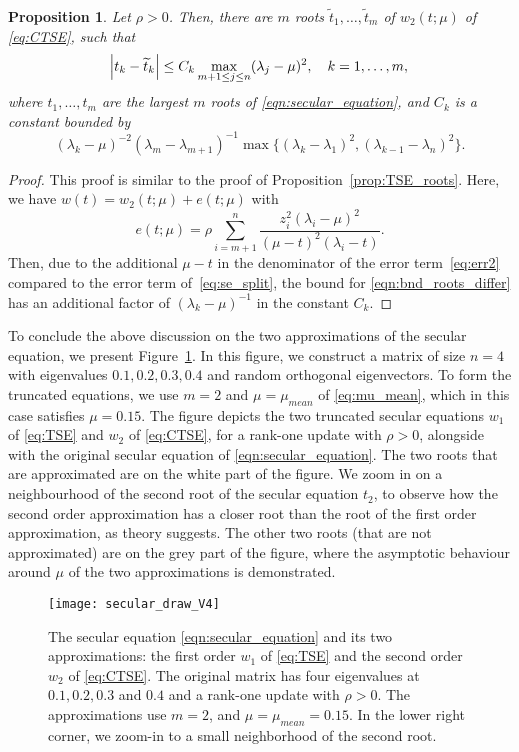 \documentclass[11pt]{article}
\newtheorem{proposition}[theorem]{Proposition}
\begin{document}
\begin{proposition}  \label{prop:CTSE_roots}
Let $\rho>0$. Then, there are $m$ roots $\widetilde{t}_1,\ldots,\widetilde{t}_m$ of $w_{2}(t ; \mu)$ of \eqref{eq:CTSE}, such that
\begin{equation} \label{eq:tse_second_order}
\abs{ t_k-\widetilde{t}_k} \le C_k \max_{m+1 \leq j \leq n} (\lambda_j - \mu)^2  , \quad k=1,\ldots,m,
\end{equation}
where ${t_1},\ldots,{t_m}$ are the largest $m$ roots of \eqref{eqn:secular_equation}, and $C_k$ is a constant bounded by 
\[ (\lambda_{k} - \mu) ^{-2}(\lambda_m - \lambda_{m+1})^{-1} \max \{ (\lambda_{k} - \lambda_1)^2,(\lambda_{k-1} - \lambda_{n})^2 \} . \]
\end{proposition}
\begin{proof}
This proof is similar to the proof of Proposition~\ref{prop:TSE_roots}. Here, we have $w(t) = w_{2}(t;\mu) + e(t;\mu)$ with 
\begin{equation} \label{eq:err2}
e(t;\mu) = \rho \sum_{i=m+1}^{n} \frac{z_i^2 (\lambda_i - \mu)^2}{(\mu - t)^2(\lambda_i-t)} .
\end{equation}
Then, due to the additional $\mu - t$ in the denominator of the error term~\eqref{eq:err2} compared to the error term of~\eqref{eq:se_split}, the bound for \eqref{eqn:bnd_roots_differ} has an additional factor of $(\lambda_k - \mu)^{-1}$ in the constant $C_k$.
\end{proof}

To conclude the above discussion on the two approximations of the secular equation, we present Figure~\ref{fig:se_and2truncatedSE}. In this figure, we construct a matrix of size $n=4$ with eigenvalues $0.1,0.2,0.3,0.4$ and random orthogonal eigenvectors. To form the truncated equations, we use $m=2$ and $\mu = \mu_{mean}$ of \eqref{eq:mu_mean}, which in this case satisfies $\mu=0.15$. The figure depicts the two truncated secular equations $w_1$ of \eqref{eq:TSE} and $w_2$ of \eqref{eq:CTSE}, for a rank-one update with $\rho>0$, alongside with the original secular equation of \eqref{eqn:secular_equation}. The two roots that are approximated are on the white part of the figure. We zoom in on a neighbourhood of the second root of the secular equation $t_2$, to observe how the second order approximation has a closer root than the root of the first order approximation, as theory suggests. The other two roots (that are not approximated) are on the grey part of the figure, where the asymptotic behaviour around $\mu$ of the two approximations is demonstrated.
\begin{figure}  
    \centering
        \texttt{[image: secular\_draw\_V4]}
        \caption{The secular equation \eqref{eqn:secular_equation} and its two approximations: the first order $w_1$ of \eqref{eq:TSE} and the second order $w_2$ of \eqref{eq:CTSE}. The original matrix has four eigenvalues at $0.1,0.2,0.3$ and $0.4$ and a rank-one update with $\rho>0$. The approximations use $m=2$, and $\mu = \mu_{mean}=0.15$. In the lower right corner, we zoom-in to a small neighborhood of the second root.} \label{fig:se_and2truncatedSE}
\end{figure}
\end{document}
